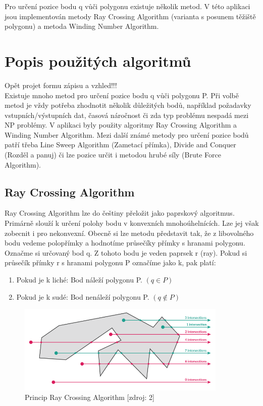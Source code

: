 \documentclass[a4paper, 12pt]{article}
\begin{document}
Pro určení pozice bodu q vůči polygonu existuje několik metod. V této aplikaci jsou implementován metody Ray Crossing Algorithm (varianta s posunem těžiště polygonu) a metoda Winding Number Algorithm.

\section{Popis použitých algoritmů}
Opět projet formu zápisu a vzhled!!!\\

Existuje mnoho metod pro určení pozice bodu q vůči polygonu P. Při volbě metod je vždy potřeba zhodnotit několik důležitých bodů, například požadavky vstupních/výstupních dat, časová náročnost či zda typ problému nespadá mezi NP problémy. V aplikaci byly použity algoritmy Ray Crossing Algorithm a Winding Number Algorithm. Mezi další známé metody pro určení pozice bodů patří třeba Line Sweep Algorithm (Zametací přímka), Divide and Conquer (Rozděl a panuj) či lze pozice určit i metodou hrubé síly (Brute Force Algorithm).

\subsection{Ray Crossing Algorithm}
Ray Crossing Algorithm lze do češtiny přeložit jako paprskový algoritmus. Primárně slouží k určení polohy bodu v konvexních mnohoúhelnících. Lze jej však zobecnit i pro nekonvexní. Obecně si lze metodu představit tak, že z libovolného bodu vedeme polopřímky a hodnotíme průsečíky přímky s hranami polygonu. \\

Označme si určovaný bod q. Z tohoto bodu je veden paprsek r (ray). Pokud si průsečík přímky r s hranami polygonu P označíme jako k, pak platí:
\begin{enumerate}
\item Pokud je k liché: Bod náleží polygonu P. $(q\in P)$ 
\item Pokud je k sudé: Bod nenáleží polygonu P.  $(q {\not \in} P)$ 
\end{enumerate}

\begin{figure}[h]
	\centering
	\includegraphics[width=10cm]{ray.png}
	\caption{Princip Ray Crossing Algorithm [zdroj: 2]}
\end{figure}
\end{document}
